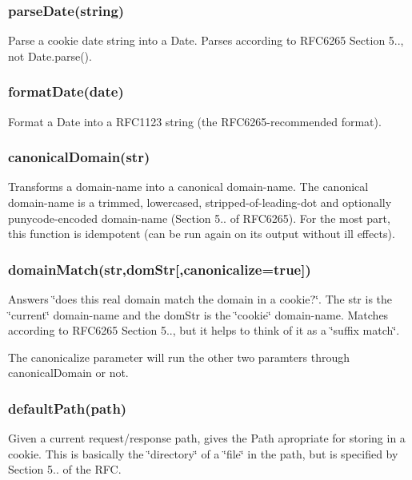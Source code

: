 \subsubsection*{{\ttfamily parse\+Date(string)}}

Parse a cookie date string into a {\ttfamily Date}. Parses according to R\+F\+C6265 Section 5.., not {\ttfamily Date.\+parse()}.

\subsubsection*{{\ttfamily format\+Date(date)}}

Format a Date into a R\+F\+C1123 string (the R\+F\+C6265-\/recommended format).

\subsubsection*{{\ttfamily canonical\+Domain(str)}}

Transforms a domain-\/name into a canonical domain-\/name. The canonical domain-\/name is a trimmed, lowercased, stripped-\/of-\/leading-\/dot and optionally punycode-\/encoded domain-\/name (Section 5.. of R\+F\+C6265). For the most part, this function is idempotent (can be run again on its output without ill effects).

\subsubsection*{{\ttfamily domain\+Match(str,dom\+Str\mbox{[},canonicalize=true\mbox{]})}}

Answers \char`\"{}does this real domain match the domain in a cookie?\char`\"{}. The {\ttfamily str} is the \char`\"{}current\char`\"{} domain-\/name and the {\ttfamily dom\+Str} is the \char`\"{}cookie\char`\"{} domain-\/name. Matches according to R\+F\+C6265 Section 5.., but it helps to think of it as a \char`\"{}suffix match\char`\"{}.

The {\ttfamily canonicalize} parameter will run the other two paramters through {\ttfamily canonical\+Domain} or not.

\subsubsection*{{\ttfamily default\+Path(path)}}

Given a current request/response path, gives the Path apropriate for storing in a cookie. This is basically the \char`\"{}directory\char`\"{} of a \char`\"{}file\char`\"{} in the path, but is specified by Section 5.. of the R\+F\+C.

